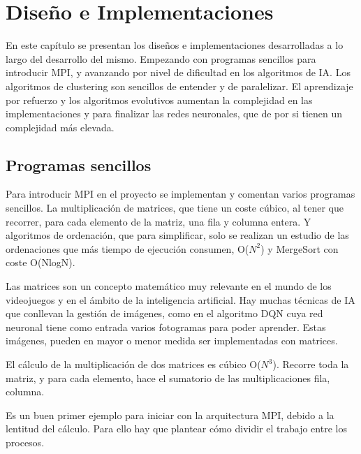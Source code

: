 

\chapter{Diseño e Implementaciones}
\label{cap:c3_implementaciones}	


	En este capítulo se presentan los diseños e implementaciones desarrolladas a lo largo del desarrollo del mismo. Empezando con programas sencillos para introducir MPI, y avanzando por nivel de dificultad en los algoritmos de IA. Los algoritmos de clustering son sencillos de entender y de paralelizar. El aprendizaje por refuerzo y los algoritmos evolutivos aumentan la complejidad en las implementaciones y para finalizar las redes neuronales, que de por si tienen un complejidad más elevada.

\section{Programas sencillos}

	Para introducir MPI en el proyecto se implementan y comentan varios programas sencillos. La multiplicación de matrices, que tiene un coste cúbico, al tener que recorrer, para cada elemento de la matriz, una fila y columna entera. Y algoritmos de ordenación, que para simplificar, solo se realizan un estudio de las ordenaciones que más tiempo de ejecución consumen, O(\(N^{2}\)) y MergeSort con coste O(NlogN).


	Las matrices son un concepto matemático muy relevante en el mundo de los videojuegos y en el ámbito de la inteligencia artificial. Hay muchas técnicas de IA que conllevan la gestión de imágenes, como en el algoritmo DQN cuya red neuronal tiene como entrada varios fotogramas para poder aprender. Estas imágenes, pueden en mayor o menor medida ser implementadas con matrices.
	
	El cálculo de la multiplicación de dos matrices es cúbico O(\(N^{3}\)). Recorre toda la matriz, y para cada elemento, hace el sumatorio de las multiplicaciones fila, columna. 
	
	Es un buen primer ejemplo para iniciar con la arquitectura MPI, debido a la lentitud del cálculo. Para ello hay que plantear cómo dividir el trabajo entre los procesos. 
	
